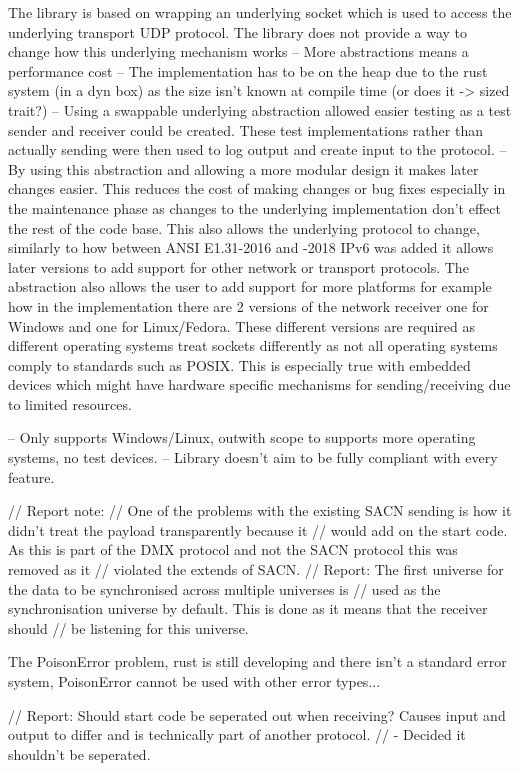 \documentclass[11pt,a4paper]{report}
\begin{document}
	
The library is based on wrapping an underlying socket which is used to access the underlying transport UDP protocol. The library does not provide a way to change how this underlying mechanism works
-- More abstractions means a performance cost
-- The implementation has to be on the heap due to the rust system (in a dyn box) as the size isn't known at compile time (or does it -> sized trait?)
-- Using a swappable underlying abstraction allowed easier testing as a test sender and receiver could be created. These test implementations rather than actually sending were then used to log output and create input to the protocol. 
-- By using this abstraction and allowing a more modular design it makes later changes easier. This reduces the cost of making changes or bug fixes especially in the maintenance phase as changes to the underlying implementation don't effect the rest of the code base. This also allows the underlying protocol to change, similarly to how between ANSI E1.31-2016 and -2018 IPv6 was added it allows later versions to add support for other network or transport protocols. The abstraction also allows the user to add support for more platforms for example how in the implementation there are 2 versions of the network receiver one for Windows and one for Linux/Fedora. These different versions are required as different operating systems treat sockets differently as not all operating systems comply to standards such as POSIX. This is especially true with embedded devices which might have hardware specific mechanisms for sending/receiving due to limited resources.


-- Only supports Windows/Linux, outwith scope to supports more operating systems, no test devices.
-- Library doesn't aim to be fully compliant with every feature.

// Report note:
// One of the problems with the existing SACN sending is how it didn't treat the payload transparently because it 
// would add on the start code. As this is part of the DMX protocol and not the SACN protocol this was removed as it 
// violated the extends of SACN.
// Report: The first universe for the data to be synchronised across multiple universes is 
// used as the synchronisation universe by default. This is done as it means that the receiver should
// be listening for this universe. 

The PoisonError problem, rust is still developing and there isn't a standard error system, PoisonError cannot be used with other error types... 

// Report: Should start code be seperated out when receiving? Causes input and output to differ and is technically part of another protocol.
// - Decided it shouldn't be seperated.
\end{document}
